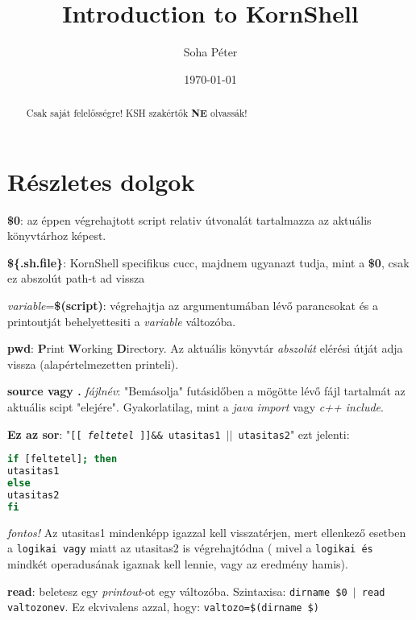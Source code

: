\documentclass{article}
\begin{document}
\title{Introduction to KornShell}
\author{Soha Péter}
\date{\today}

\maketitle

\begin{abstract}
Csak saját felelősségre! KSH szakértők \textbf{NE} olvassák!
\end{abstract}

\section{Részletes dolgok}
\textbf{\$0}: az éppen végrehajtott script relativ útvonalát tartalmazza az aktuális könyvtárhoz képest.\newline

\textbf{\$\{.sh.file\}}: KornShell specifikus cucc,  majdnem ugyanazt tudja, mint a \textbf{\$0}, csak ez abszolút path-t ad vissza\newline

\textit{variable}=\textbf{\$(script)}: végrehajtja az argumentumában lévő parancsokat és a printoutját behelyettesiti a \textit{variable} változóba.\newline

\textbf{pwd}: \textbf{P}rint \textbf{W}orking \textbf{D}irectory. Az aktuális könyvtár \textit{abszolút} elérési útját adja vissza (alapértelmezetten printeli).\newline

\textbf{source vagy .} \textit{fájlnév}: "Bemásolja" futásidőben a mögötte lévő fájl tartalmát az aktuális scipt "elejére". Gyakorlatilag, mint a \textit{java import} vagy \textit{c++ include}.\newline 

\textbf{Ez az sor}: 
"\texttt{[[ \textit{feltetel} ]]\&\& utasitas1 $||$ utasitas2}" ezt jelenti: 
\begin{lstlisting}[language=bash]
if [feltetel]; then
utasitas1 
else
utasitas2
fi
\end{lstlisting}
\textit{fontos!} Az utasitas1 mindenképp igazzal kell visszatérjen, mert ellenkező esetben a \texttt{logikai vagy} miatt az utasitas2 is végrehajtódna ( mivel a \texttt{logikai és} mindkét operadusának igaznak kell lennie, vagy az eredmény hamis).\newline

\textbf{read}: beletesz egy \textit{printout}-ot egy változóba. Szintaxisa: \texttt{dirname \$0 $|$ read valtozonev}. Ez ekvivalens azzal, hogy: \texttt{valtozo=\$(dirname \$)}\newline
\end{document}
